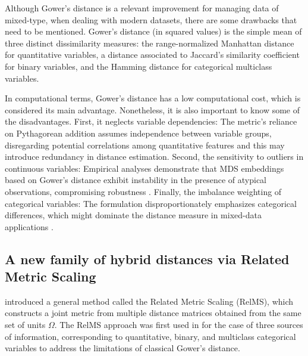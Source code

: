 Although Gower's distance is a relevant improvement for managing data of mixed-type, when dealing with modern datasets, there are some drawbacks that need to be mentioned. Gower's distance (in squared values) is the simple mean of three distinct dissimilarity measures: the range-normalized Manhattan distance for quantitative variables, a distance associated to Jaccard's similarity coefficient for binary variables, and the Hamming distance for categorical multiclass variables.

In computational terms, Gower's distance has a low computational cost, which is considered its main advantage. Nonetheless, it is also important to know some of the disadvantages. First, it neglects variable dependencies: The metric's reliance on Pythagorean addition assumes independence between variable groups, disregarding potential correlations among quantitative features \citep{krzanowski1994ordination} and this may introduce redundancy in distance estimation. Second, the sensitivity to outliers in continuous variables: Empirical analyses demonstrate that MDS embeddings based on Gower's distance exhibit instability in the presence of atypical observations, compromising robustness \citep{gower1986metric, albarran2015profile, grane2018visualizing, grane2021robust, boj2024robustification}. Finally, the imbalance weighting of categorical variables: The formulation disproportionately emphasizes categorical differences, which might dominate the distance measure in mixed-data applications \citep{podani1999extending}.

\subsection{A new family of hybrid distances via Related Metric Scaling}
\label{sec:RelMS_space_construction}

\cite{cuadras1998visualizing} introduced a general method called the Related Metric Scaling (RelMS), which constructs a joint metric from multiple distance matrices obtained from the same set of units $\Omega$. The RelMS approach was first used in \cite{albarran2015profile} for the case of three sources of information, corresponding to quantitative, binary, and multiclass categorical variables to address the limitations of classical Gower's distance.

